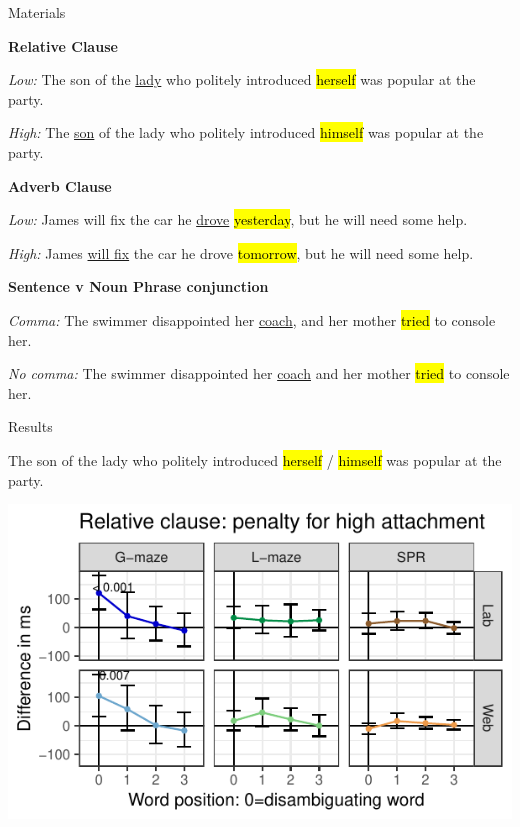 \documentclass[12pt, xcolor=beamer,table,usenames,dvipsnames, ignorenonframetext, ngerman]{beamer}
\makeatletter
\let\HL\hl
\renewcommand\hl{%
	\let\set@color\beamerorig@set@color
	\let\reset@color\beamerorig@reset@color
	\HL}
\makeatother
\begin{document}
\begin{frame}{Materials}

\textbf{Relative Clause}

\textit{Low:} The son of the \uline{lady} who politely introduced \hl{herself} was popular at the party.

 \textit{High:} The \uline{son} of the lady who politely introduced \hl{himself} was popular at the party.
 

\textbf{Adverb Clause}

\textit{Low:} James will fix the car he \uline{drove} \hl{yesterday}, but he will need some help.

 \textit{High:} James \uline{will fix} the car he drove \hl{tomorrow}, but he will need some help.
		
\textbf{Sentence v Noun Phrase conjunction}

 \textit{Comma:} The swimmer disappointed her \uline{coach}, and her mother \hl{tried} to console her.

\textit{No comma:} The swimmer disappointed her \uline{coach} and her mother \hl{tried} to console her.
\end{frame}

\begin{frame}{Results}
\begin{small}	
The son of the lady who politely introduced \hl{herself} / \hl{himself} was popular at the party.
	
\end{small}
\includegraphics[width=\textwidth]{../Images/g_rel.pdf}
\end{frame}
\end{document}
